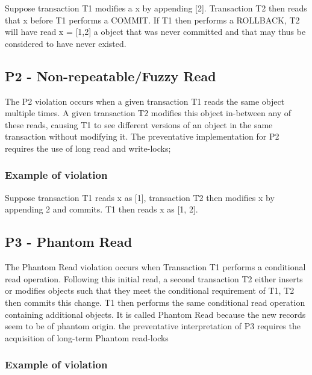 \documentclass[a4paper,10pt,titlepage]{report}
\begin{document}
Suppose transaction T1 modifies a x by appending [2]. Transaction T2 then reads that x before T1 performs a COMMIT. If T1 then performs a ROLLBACK, T2 will have read x = [1,2] a object that was never committed and that may thus be considered to have never existed.\\
\vspace{2mm}

\vspace{2mm}
\newpage
\subsection{P2 - Non-repeatable/Fuzzy Read}
The P2 violation occurs when a given transaction T1 reads the same object multiple times. A given transaction T2 modifies this object in-between any of these reads, causing T1 to see different versions of an object in the same transaction without modifying it. The preventative implementation for P2 requires the use of long read and write-locks; 

\subsubsection{Example of violation}
Suppose transaction T1 reads x as [1], transaction T2 then modifies x by appending 2 and commits. T1 then reads x as [1, 2].\\
\vspace{2mm}

\vspace{2mm}
 


\subsection{P3 - Phantom Read}

The Phantom Read violation occurs when Transaction T1 performs a conditional read operation. Following this initial read, a second transaction T2 either inserts or modifies objects such that they meet the conditional requirement of T1, T2 then commits this change. T1 then performs the same conditional read operation containing additional objects. It is called Phantom Read because the new records seem to be of phantom origin. the preventative interpretation of P3 requires the acquisition of long-term Phantom read-locks

\subsubsection{Example of violation}
\end{document}
